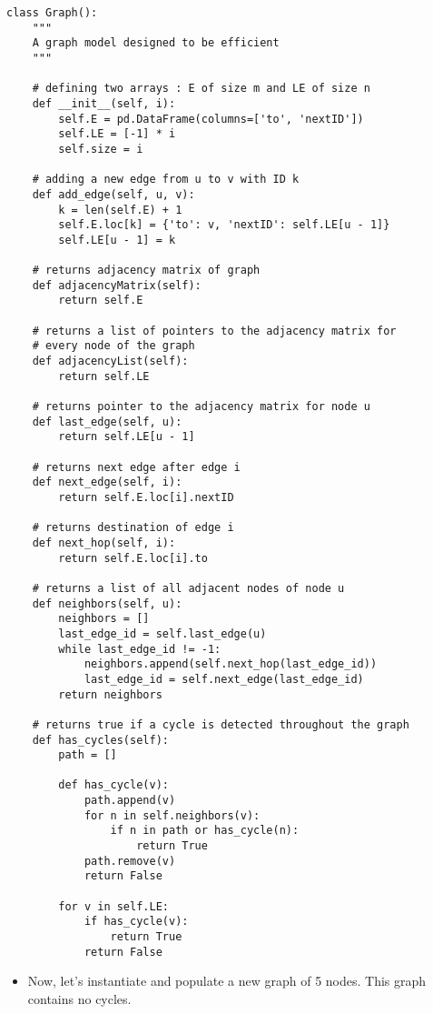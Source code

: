 \documentclass[11pt]{article}
\begin{document}
\begin{verbatim}
class Graph():
    """
    A graph model designed to be efficient
    """

    # defining two arrays : E of size m and LE of size n
    def __init__(self, i):
        self.E = pd.DataFrame(columns=['to', 'nextID'])
        self.LE = [-1] * i
        self.size = i

    # adding a new edge from u to v with ID k
    def add_edge(self, u, v):
        k = len(self.E) + 1
        self.E.loc[k] = {'to': v, 'nextID': self.LE[u - 1]}
        self.LE[u - 1] = k

    # returns adjacency matrix of graph
    def adjacencyMatrix(self):
        return self.E

    # returns a list of pointers to the adjacency matrix for
    # every node of the graph
    def adjacencyList(self):
        return self.LE

    # returns pointer to the adjacency matrix for node u
    def last_edge(self, u):
        return self.LE[u - 1]

    # returns next edge after edge i
    def next_edge(self, i):
        return self.E.loc[i].nextID

    # returns destination of edge i
    def next_hop(self, i):
        return self.E.loc[i].to

    # returns a list of all adjacent nodes of node u
    def neighbors(self, u):
        neighbors = []
        last_edge_id = self.last_edge(u)
        while last_edge_id != -1:
            neighbors.append(self.next_hop(last_edge_id))
            last_edge_id = self.next_edge(last_edge_id)
        return neighbors

    # returns true if a cycle is detected throughout the graph
    def has_cycles(self):
        path = []

        def has_cycle(v):
            path.append(v)
            for n in self.neighbors(v):
                if n in path or has_cycle(n):
                    return True
            path.remove(v)
            return False

        for v in self.LE:
            if has_cycle(v):
                return True
            return False
\end{verbatim}

\begin{itemize}
\item Now, let's instantiate and populate a new graph of 5 nodes. This graph
contains no cycles.
\end{itemize}
\end{document}
